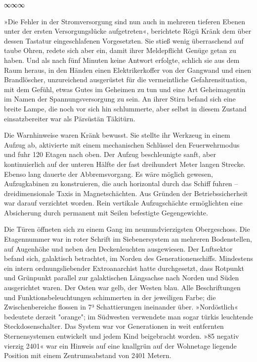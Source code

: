 \begin{center}
	∞∞∞
\end{center}

»Die Fehler in der Stromversorgung sind nun auch in mehreren tieferen Ebenen unter der ersten Versorgungslücke aufgetreten«, berichtete Rögü Kränk dem über dessen Tastatur eingeschlafenen Vorgesetzten. Sie stieß wenig überraschend auf taube Ohren, redete sich aber ein, damit ihrer Meldepflicht Genüge getan zu haben. Und als nach fünf Minuten keine Antwort erfolgte, schlich sie aus dem Raum heraus, in den Händen einen Elektrikerkoffer von der Gangwand und einen Brandlöscher, unzureichend ausgerüstet für die vermeintliche Gefahrensituation, mit dem Gefühl, etwas Gutes im Geheimen zu tun und eine Art Geheimagentin im Namen der Spannungsversorgung zu sein. An ihrer Stirn befand sich eine breite Lampe, die noch vor sich hin schlummerte, aber selbst in diesem Zustand einsatzbereiter war als Pärsüstän Täkitürn.

 Die Warnhinweise waren Kränk bewusst. Sie stellte ihr Werkzeug in einem Aufzug ab, aktivierte mit einem mechanischen Schlüssel den Feuerwehrmodus und fuhr 120 Etagen nach oben. Der Aufzug beschleunigte sanft, aber kontinuierlich auf der unteren Hälfte der fast dreihundert Meter langen Strecke. Ebenso lang dauerte der Abbremsvorgang. Es wäre möglich gewesen, Aufzugkabinen zu konstruieren, die auch horizontal durch das Schiff fuhren – dreidimensionale Taxis in Magnetschächten. Aus Gründen der Betriebssicherheit war darauf verzichtet worden. Rein vertikale Aufzugschächte ermöglichten eine Absicherung durch permanent mit Seilen befestigte Gegengewichte.

Die Türen öffneten sich zu einem Gang im neunundvierzigsten Obergeschoss. Die Etagennummer war in roter Schrift im Siebenersystem an mehreren Bodenstellen, auf Augenhöhe und neben den Deckenleuchten ausgewiesen. Der Luftsektor befand sich, galaktisch betrachtet, im Norden des Generationenschiffs. Mindestens ein intern ordnungsliebender Extroanarchist hatte durchgesetzt, dass Rotpunkt und Grünpunkt parallel zur galaktischen Längsachse nach Norden und Süden ausgerichtet waren. Der Osten war gelb, der Westen blau. Alle Beschriftungen und Funktionsbeleuchtungen schimmerten in der jeweiligen Farbe; die Zwischenbereiche flossen in 7³ Schattierungen ineinander über. »Nordöstlich« bedeutete derzeit "orange"; im Südwesten verwendete man sogar türkis leuchtende Steckdosenschalter. Das System war vor Generationen in weit entfernten Sternensystemen entwickelt und jedem Kind beigebracht worden. »85 negativ vierzig 2401« war ein Hinweis auf eine knallgrün auf der Wohnetage liegende Position mit einem Zentrumsabstand von 2401 Metern.

